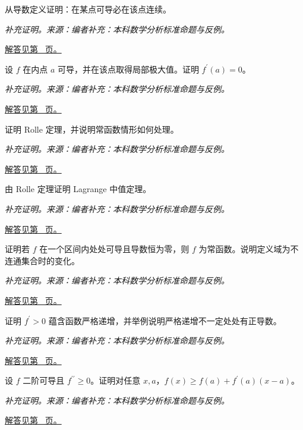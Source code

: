 \documentclass[12pt,fontset=fandol]{ctexart}
\begin{document}
\begin{example}[可导推出连续]\label{ex:c7q7}
从导数定义证明：在某点可导必在该点连续。
\par\textit{补充证明。来源：编者补充：本科数学分析标准命题与反例。}\par\hyperref[ans:c7q7]{解答见第~\pageref{ans:c7q7} 页。}
\end{example}
\begin{example}\label{ex:c7q8}
设 $f$ 在内点 $a$ 可导，并在该点取得局部极大值。证明 $f^{\prime}(a)=0$。
\par\textit{补充证明。来源：编者补充：本科数学分析标准命题与反例。}\par\hyperref[ans:c7q8]{解答见第~\pageref{ans:c7q8} 页。}
\end{example}
\begin{example}\label{ex:c7q9}
证明 Rolle 定理，并说明常函数情形如何处理。
\par\textit{补充证明。来源：编者补充：本科数学分析标准命题与反例。}\par\hyperref[ans:c7q9]{解答见第~\pageref{ans:c7q9} 页。}
\end{example}
\begin{example}\label{ex:c7q10}
由 Rolle 定理证明 Lagrange 中值定理。
\par\textit{补充证明。来源：编者补充：本科数学分析标准命题与反例。}\par\hyperref[ans:c7q10]{解答见第~\pageref{ans:c7q10} 页。}
\end{example}
\begin{example}[导数恒零推出常函数]\label{ex:c7q11}
证明若 $f$ 在一个区间内处处可导且导数恒为零，则 $f$ 为常函数。说明定义域为不连通集合时的变化。
\par\textit{补充证明。来源：编者补充：本科数学分析标准命题与反例。}\par\hyperref[ans:c7q11]{解答见第~\pageref{ans:c7q11} 页。}
\end{example}
\begin{example}[严格递增的充分条件并非必要]\label{ex:c7q12}
证明 $f^{\prime}>0$ 蕴含函数严格递增，并举例说明严格递增不一定处处有正导数。
\par\textit{补充证明。来源：编者补充：本科数学分析标准命题与反例。}\par\hyperref[ans:c7q12]{解答见第~\pageref{ans:c7q12} 页。}
\end{example}
\begin{example}[凸函数的切线下界]\label{ex:c7q13}
设 $f$ 二阶可导且 $f^{\prime\prime}\ge0$。证明对任意 $x,a$，$f(x)\ge f(a)+f^{\prime}(a)(x-a)$。
\par\textit{补充证明。来源：编者补充：本科数学分析标准命题与反例。}\par\hyperref[ans:c7q13]{解答见第~\pageref{ans:c7q13} 页。}
\end{example}
\end{document}
